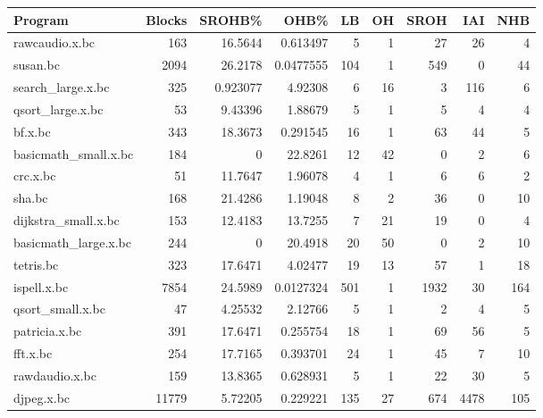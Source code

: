\begin{tabular}{lrrrr}
\hline
\end{tabular}\begin{tabular}{lrrrrrrrr}
\hline
 Program              &   Blocks &    SROHB\% &       OHB\% &   LB &   OH &   SROH &   IAI &   NHB \\
\hline
 rawcaudio.x.bc       &      163 & 16.5644   &  0.613497  &    5 &    1 &     27 &    26 &     4 \\
 susan.bc             &     2094 & 26.2178   &  0.0477555 &  104 &    1 &    549 &     0 &    44 \\
 search\_large.x.bc    &      325 &  0.923077 &  4.92308   &    6 &   16 &      3 &   116 &     6 \\
 qsort\_large.x.bc     &       53 &  9.43396  &  1.88679   &    5 &    1 &      5 &     4 &     4 \\
 bf.x.bc              &      343 & 18.3673   &  0.291545  &   16 &    1 &     63 &    44 &     5 \\
 basicmath\_small.x.bc &      184 &  0        & 22.8261    &   12 &   42 &      0 &     2 &     6 \\
 crc.x.bc             &       51 & 11.7647   &  1.96078   &    4 &    1 &      6 &     6 &     2 \\
 sha.bc               &      168 & 21.4286   &  1.19048   &    8 &    2 &     36 &     0 &    10 \\
 dijkstra\_small.x.bc  &      153 & 12.4183   & 13.7255    &    7 &   21 &     19 &     0 &     4 \\
 basicmath\_large.x.bc &      244 &  0        & 20.4918    &   20 &   50 &      0 &     2 &    10 \\
 tetris.bc            &      323 & 17.6471   &  4.02477   &   19 &   13 &     57 &     1 &    18 \\
 ispell.x.bc          &     7854 & 24.5989   &  0.0127324 &  501 &    1 &   1932 &    30 &   164 \\
 qsort\_small.x.bc     &       47 &  4.25532  &  2.12766   &    5 &    1 &      2 &     4 &     5 \\
 patricia.x.bc        &      391 & 17.6471   &  0.255754  &   18 &    1 &     69 &    56 &     5 \\
 fft.x.bc             &      254 & 17.7165   &  0.393701  &   24 &    1 &     45 &     7 &    10 \\
 rawdaudio.x.bc       &      159 & 13.8365   &  0.628931  &    5 &    1 &     22 &    30 &     5 \\
 djpeg.x.bc           &    11779 &  5.72205  &  0.229221  &  135 &   27 &    674 &  4478 &   105 \\

\end{tabular}
